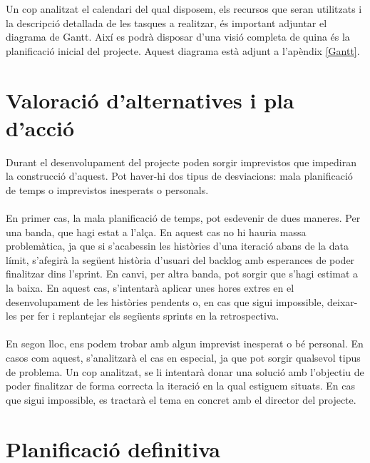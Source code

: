 Un cop analitzat el calendari del qual disposem, els recursos que seran utilitzats i la descripció detallada de les tasques a realitzar, és important adjuntar el diagrama de Gantt\cite{gantt}. Així es podrà disposar d'una visió completa de quina és la planificació inicial del projecte. Aquest diagrama està adjunt a l'apèndix \ref{Gantt}.


\section{Valoració d'alternatives i pla d'acció}

Durant el desenvolupament del projecte poden sorgir imprevistos que impediran la construcció d'aquest. Pot haver-hi dos tipus de desviacions: mala planificació de temps o imprevistos inesperats o personals.
\\\\
En primer cas, la mala planificació de temps, pot esdevenir de dues maneres. Per una banda, que hagi estat a l'alça. En aquest cas no hi hauria massa problemàtica, ja que si s'acabessin les històries d'una iteració abans de la data límit, s'afegirà la següent història d'usuari del backlog amb esperances de poder finalitzar dins l'sprint. En canvi, per altra banda, pot sorgir que s'hagi estimat a la baixa. En aquest cas, s'intentarà aplicar unes hores extres en el desenvolupament de les històries pendents o, en cas que sigui impossible, deixar-les per fer i replantejar els següents sprints en la retrospectiva.
\\\\
En segon lloc, ens podem trobar amb algun imprevist inesperat o bé personal. En casos com aquest, s'analitzarà el cas en especial, ja que pot sorgir qualsevol tipus de problema. Un cop analitzat, se li intentarà donar una solució amb l'objectiu de poder finalitzar de forma correcta la iteració en la qual estiguem situats. En cas que sigui impossible, es tractarà el tema en concret amb el director del projecte.


\section{Planificació definitiva}

